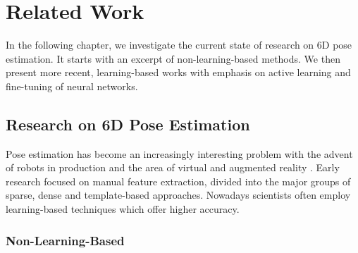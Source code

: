 \chapter{Related Work} \label{chapter:related_work}

In the following chapter, we investigate the current state of research on 6D pose estimation. It starts with an excerpt of non-learning-based methods. We then present more recent, learning-based works with emphasis on active learning and fine-tuning of neural networks.

\section{Research on 6D Pose Estimation}

Pose estimation has become an increasingly interesting problem with the advent of robots in production and the area of virtual and augmented reality \cite{bb8}. Early research focused on manual feature extraction, divided into the major groups of sparse, dense and template-based approaches. Nowadays scientists often employ learning-based techniques which offer higher accuracy.

\subsection{Non-Learning-Based}

